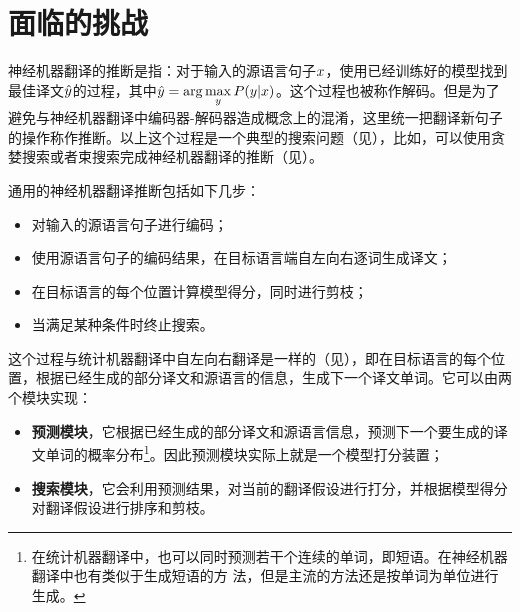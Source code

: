 \section{面临的挑战}

\parinterval 神经机器翻译的推断是指：对于输入的源语言句子${x}$，使用已经训练好的模型找到最佳译文$\hat{{y}}$的过程，其中$\hat{{y}}=\arg\max\limits_{{y}}{P}({y}|{x})$。这个过程也被称作解码。但是为了避免与神经机器翻译中编码器-解码器造成概念上的混淆，这里统一把翻译新句子的操作称作推断。以上这个过程是一个典型的搜索问题（见{\chaptertwo}），比如，可以使用贪婪搜索或者束搜索完成神经机器翻译的推断（见{\chapterten}）。

\parinterval 通用的神经机器翻译推断包括如下几步：

\begin{itemize}
\vspace{0.5em}
\item 对输入的源语言句子进行编码；
\vspace{0.5em}
\item 使用源语言句子的编码结果，在目标语言端自左向右逐词生成译文；
\vspace{0.5em}
\item 在目标语言的每个位置计算模型得分，同时进行剪枝；
\vspace{0.5em}
\item 当满足某种条件时终止搜索。
\vspace{0.5em}
\end{itemize}

\parinterval 这个过程与统计机器翻译中自左向右翻译是一样的（见{\chapterseven}），即在目标语言的每个位置，根据已经生成的部分译文和源语言的信息，生成下一个译文单词。它可以由两个模块实现：

\begin{itemize}
\vspace{0.5em}
\item {\small\sffamily\bfseries{预测模块}}，它根据已经生成的部分译文和源语言信息，预测下一个要生成的译文单词的概率分布\footnote{在统计机器翻译中，也可以同时预测若干个连续的单词，即短语。在神经机器翻译中也有类似于生成短语的方
法，但是主流的方法还是按单词为单位进行生成。}。因此预测模块实际上就是一个模型打分装置；
\vspace{0.5em}
\item {\small\sffamily\bfseries{搜索模块}}，它会利用预测结果，对当前的翻译假设进行打分，并根据模型得分对翻译假设进行排序和剪枝。
\vspace{0.5em}
\end{itemize}


